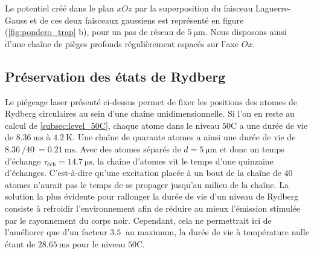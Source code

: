 Le potentiel créé dans le plan $xOz$ par la superposition du faisceau Laguerre-Gauss et de ces deux faisceaux gaussiens est représenté en figure (\ref{fig:pondero_trap} b), pour un pas de réseau de $\SI{5}{\um}$.
Nous disposons ainsi d'une chaîne de pièges profonds régulièrement espacés sur l'axe $Ox$.

	
	\subsection{Préservation des états de Rydberg}\label{subsec:inhibition}
\noindent Le piégeage laser présenté ci-dessus permet de fixer les positions des atomes de Rydberg circulaires au sein d'une chaîne unidimensionnelle.
Si l'on en reste au calcul de \ref{subsec:level_50C}, chaque atome dans le niveau $\mathrm{50C}$ a une durée de vie de $\SI{8.36}{\ms}$ à $\SI{4.2}{\K}$.
Une chaîne de quarante atomes a ainsi une durée de vie de $\SI{8.36}{}/\SI{40}{} = \SI{0.21}{\ms}$.
Avec des atomes séparés de $d=\SI{5}{\um}$ et donc un temps d'échange $\tau_{\text{éch}} = \SI{14.7}{\us}$, la chaîne d'atomes vit le temps d'une quinzaine d'échanges.
C'est-à-dire qu'une excitation placée à un bout de la chaîne de $\SI{40}{}$ atomes n'aurait pas le temps de se propager jusqu'au milieu de la chaîne.
La solution la plus évidente pour rallonger la durée de vie d'un niveau de Rydberg consiste à refroidir l'environnement afin de réduire au mieux l'émission stimulée par le rayonnement du corps noir.
Cependant, cela ne permettrait ici de l'améliorer que d'un facteur $%
\SI{3.5}{}$ au maximum, la durée de vie à température nulle étant de $\SI{28.65}{\ms}$ pour le niveau $\mathrm{50C}$.

